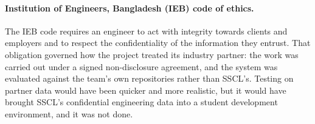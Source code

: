 \paragraph{Institution of Engineers, Bangladesh (IEB) code of ethics.} The IEB
code requires an engineer to act with integrity towards clients and employers
and to respect the confidentiality of the information they entrust. That
obligation governed how the project treated its industry partner: the work was
carried out under a signed non-disclosure agreement, and the system was
evaluated against the team's own repositories rather than SSCL's. Testing on
partner data would have been quicker and more realistic, but it would have
brought SSCL's confidential engineering data into a student development
environment, and it was not done.
